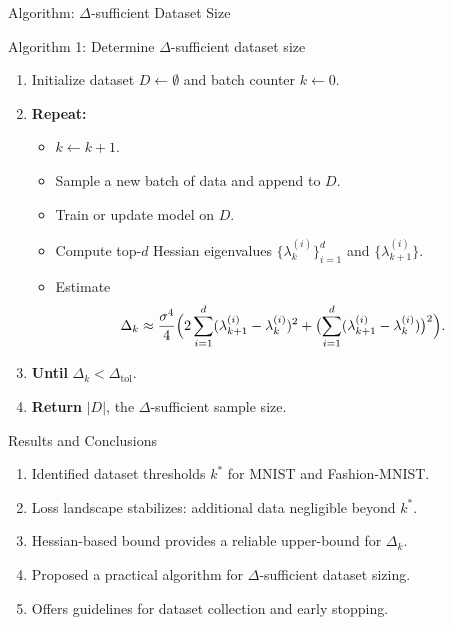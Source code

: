 \documentclass{beamer}
\begin{document}
\begin{frame}{Algorithm: \(\Delta\)-sufficient Dataset Size}
    \begin{block}{Algorithm 1: Determine \(\Delta\)-sufficient dataset size}
        \begin{enumerate}
            \item Initialize dataset \(D \gets \emptyset\) and batch counter \(k \gets 0\).
            \item \textbf{Repeat:}
                  \begin{itemize}
                      \item \(k \gets k + 1\).
                      \item Sample a new batch of data and append to \(D\).
                      \item Train or update model on \(D\).
                      \item Compute top-\(d\) Hessian eigenvalues \(\{\lambda_k^{(i)}\}_{i=1}^d\) and \(\{\lambda_{k+1}^{(i)}\}\).
                      \item Estimate
                            \[
                                \Delta_k \approx \frac{\sigma^4}{4}\Bigl(2\sum_{i=1}^d(\lambda_{k+1}^{(i)}-\lambda_k^{(i)})^2
                                + \bigl(\sum_{i=1}^d(\lambda_{k+1}^{(i)}-\lambda_k^{(i)})\bigr)^2\Bigr).
                            \]
                  \end{itemize}
            \item \textbf{Until} \(\Delta_k < \Delta_{\text{tol}}\).
            \item \textbf{Return} \(|D|\), the \(\Delta\)-sufficient sample size.
        \end{enumerate}
    \end{block}
\end{frame}

\begin{frame}{Results and Conclusions}
    \begin{enumerate}
        \item Identified dataset thresholds \(k^*\) for MNIST and Fashion-MNIST.
        \item Loss landscape stabilizes: additional data negligible beyond \(k^*\).
        \item Hessian-based bound provides a reliable upper-bound for \(\Delta_k\).
        \item Proposed a practical algorithm for \(\Delta\)-sufficient dataset sizing.
        \item Offers guidelines for dataset collection and early stopping.
    \end{enumerate}
\end{frame}
\end{document}

